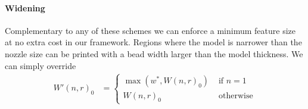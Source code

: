 \paragraph{Widening}
Complementary to any of these schemes we can enforce a minimum feature size at no extra cost in our framework.
Regions where the model is narrower than the nozzle size can be printed with a bead width larger than the model thickness.
We can simply override
\begin{align*}
W'(n,r)_0 &=
\begin{cases}
\max \left( w^*  ,  W(n,r)_0 \right) & \text{ if } n = 1 \\
W(n,r)_0 & \text{ otherwise}
\end{cases}
\end{align*}




















